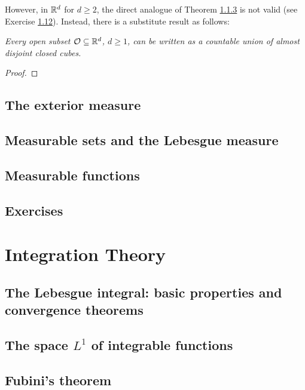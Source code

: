\documentclass[12pt, a4paper, openany, twoside]{book}
\theoremstyle{definition}
\theoremstyle{remark}
\theoremstyle{plain}
\numberwithin{equation}{section}
\begin{document}
However, in ${\mathbb {R}}^d$ for $d\geq 2$, the direct analogue of Theorem \hyperref[Theorem 1.1.3]{1.1.3} is not valid (see Exercise \hyperref[Exercise 1.12]{1.12}). Instead, there is a substitute result as follows:
\vspace{5mm}
\begin{tcolorbox}[colback=yellow!10!white,colframe=red!75!black,title=Theorem 1.1.4]\label{Theorem 1.1.4}
    \emph{Every open subset $\mathcal{O}\subseteq{\mathbb {R}}^d$, $d\geq 1$, can be written as a countable union of almost disjoint closed cubes.}
\end{tcolorbox}
\begin{proof}
    
\end{proof}








\newpage
\section{The exterior measure}

\newpage
\section{Measurable sets and the Lebesgue measure}

\newpage
\section{Measurable functions}

\newpage
\section{Exercises}



\chapter{Integration Theory}
\section{The Lebesgue integral: basic properties and convergence theorems}
\section{The space $L^1$ of integrable functions}
\section{Fubini's theorem}
\end{document}
